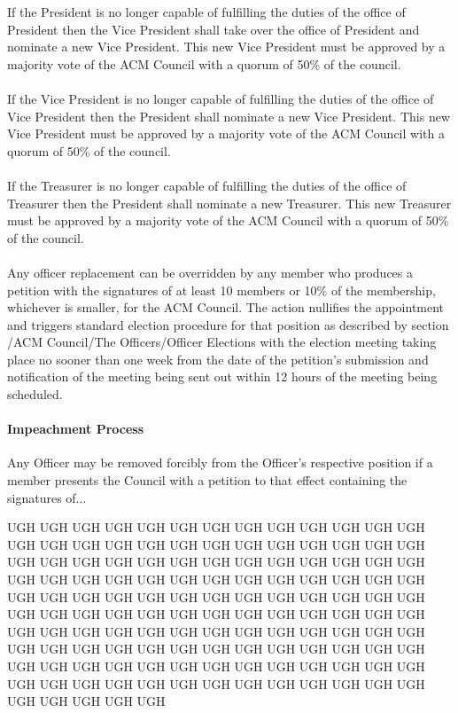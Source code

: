 \documentclass[12pt,titlepage]{article}
\begin{document}
If the President is no longer capable of fulfilling the duties of the office of President then the Vice President shall take over the office of President and nominate a new Vice President. This new Vice President must be approved by a majority vote of the ACM Council with a quorum of 50\% of the council.\\
\\
If the Vice President is no longer capable of fulfilling the duties of the office of Vice President then the President shall nominate a new Vice President. This new Vice President must be approved by a majority vote of the ACM Council with a quorum of 50\% of the council.\\
\\
If the Treasurer is no longer capable of fulfilling the duties of the office of Treasurer then the President shall nominate a new Treasurer. This new Treasurer must be approved by a majority vote of the ACM Council with a quorum of 50\% of the council.\\
\\
Any officer replacement can be overridden by any member who produces a petition with the signatures of at least 10 members or 10\% of the membership, whichever is smaller, for the ACM Council. The action nullifies the appointment and triggers standard election procedure for that position as described by section /ACM Council/The Officers/Officer Elections with the election meeting taking place no sooner than one week from the date of the petition's submission and notification of the meeting being sent out within 12 hours of the meeting being scheduled.

\paragraph{Impeachment Process}

Any Officer may be removed forcibly from the Officer's respective position if a member presents the Council with a petition to that effect containing the signatures of...

    UGH UGH UGH UGH UGH UGH UGH UGH UGH UGH UGH UGH UGH UGH UGH UGH UGH UGH UGH UGH UGH UGH UGH UGH UGH UGH UGH 
    UGH UGH UGH UGH UGH UGH UGH UGH UGH UGH UGH UGH UGH UGH UGH UGH UGH UGH UGH UGH UGH UGH UGH UGH UGH UGH UGH 
    UGH UGH UGH UGH UGH UGH UGH UGH UGH UGH UGH UGH UGH UGH UGH UGH UGH UGH UGH UGH UGH UGH UGH UGH UGH UGH UGH 
    UGH UGH UGH UGH UGH UGH UGH UGH UGH UGH UGH UGH UGH UGH UGH UGH UGH UGH UGH UGH UGH UGH UGH UGH UGH UGH UGH 
    UGH UGH UGH UGH UGH UGH UGH UGH UGH UGH UGH UGH UGH UGH UGH UGH UGH UGH UGH UGH UGH UGH UGH UGH UGH UGH UGH 
\end{document}

